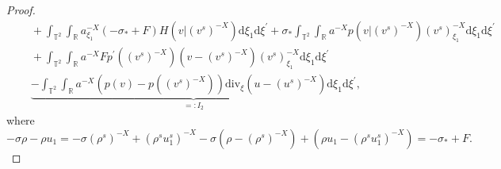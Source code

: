 \documentclass[10pt,reqno]{amsart}
\numberwithin{equation}{section}
\newcommand{\dif}{\mathrm{d}}
\newcommand{\ddiv}{\mathrm{div}}
\begin{document}
\begin{proof}
\begin{equation}
\begin{aligned}
&\quad+\int_{\mathbb{T}^2}\int_{\mathbb{R}}a^{-X}_{\xi_1}(-\sigma_\ast+F) H(v|(v^s)^{-X})\dif \xi_1\dif \xi^{\prime}
+\sigma_\ast\int_{\mathbb{T}^2}\int_{\mathbb{R}}a^{-X}p(v|(v^s)^{-X})(v^s)^{-X}_{\xi_1}\dif \xi_1\dif \xi^{\prime}\\
&\quad+\int_{\mathbb{T}^2}\int_{\mathbb{R}}a^{-X}Fp^{\prime}((v^s)^{-X})(v-(v^s)^{-X})(v^s)^{-X}_{\xi_1}\dif \xi_1\dif \xi^{\prime}\\
&\quad\underbrace{-\int_{\mathbb{T}^2}\int_{\mathbb{R}}a^{-X}\left(p(v)-p((v^s)^{-X})\right)\ddiv_\xi (u-(u^s)^{-X})\dif \xi_1\dif \xi^{\prime}}\limits_{=:I_2},
\end{aligned}
\end{equation}
where%
\begin{equation*}
	-\sigma\rho-\rho u_1
	=-\sigma(\rho^s)^{-X}+(\rho^su_1^s)^{-X}-\sigma(\rho-(\rho^s)^{-X})+(\rho u_1-(\rho^su_1^s)^{-X})
	=-\sigma_\ast+F.
\end{equation*}


\end{proof}
\end{document}
